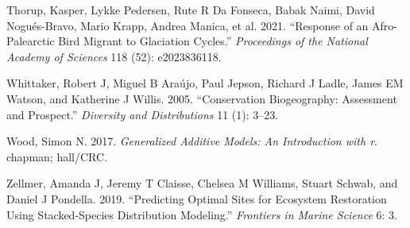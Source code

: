 \documentclass[
]{article}
\newlength{\cslhangindent}
\newenvironment{CSLReferences}[2] %
 {\begin{list}{}{%
  \setlength{\itemindent}{0pt}
  \setlength{\leftmargin}{0pt}
  \setlength{\parsep}{0pt}
  \ifodd #1
   \setlength{\leftmargin}{\cslhangindent}
   \setlength{\itemindent}{-1\cslhangindent}
  \fi
  \setlength{\itemsep}{#2\baselineskip}}}
 {\end{list}}
\begin{document}
\begin{CSLReferences}{1}{0}
Thorup, Kasper, Lykke Pedersen, Rute R Da Fonseca, Babak Naimi, David
Nogués-Bravo, Mario Krapp, Andrea Manica, et al. 2021. {``Response of an
Afro-Palearctic Bird Migrant to Glaciation Cycles.''} \emph{Proceedings
of the National Academy of Sciences} 118 (52): e2023836118.

Whittaker, Robert J, Miguel B Araújo, Paul Jepson, Richard J Ladle,
James EM Watson, and Katherine J Willis. 2005. {``Conservation
Biogeography: Assessment and Prospect.''} \emph{Diversity and
Distributions} 11 (1): 3--23.

Wood, Simon N. 2017. \emph{Generalized Additive Models: An Introduction
with r}. chapman; hall/CRC.

Zellmer, Amanda J, Jeremy T Claisse, Chelsea M Williams, Stuart Schwab,
and Daniel J Pondella. 2019. {``Predicting Optimal Sites for Ecosystem
Restoration Using Stacked-Species Distribution Modeling.''}
\emph{Frontiers in Marine Science} 6: 3.

\end{CSLReferences}
\end{document}
